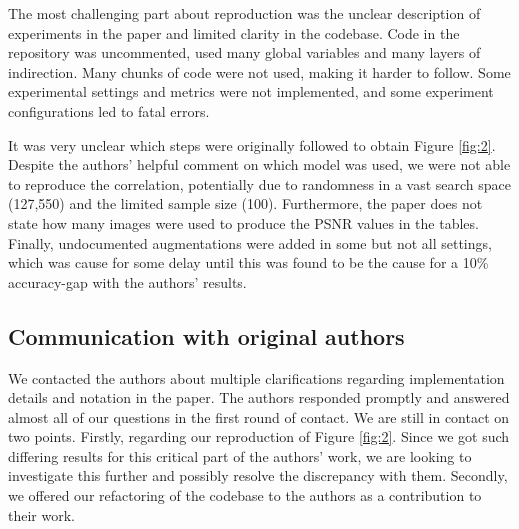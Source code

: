 The most challenging part about reproduction was the unclear description of experiments in the paper and limited clarity in the codebase. Code in the repository was uncommented, used many global variables and many layers of indirection. Many chunks of code were not used, making it harder to follow. Some experimental settings and metrics were not implemented, and some experiment configurations led to fatal errors.

It was very unclear which steps were originally followed to obtain Figure \ref{fig:2}. Despite the authors' helpful comment on which model was used, we were not able to reproduce the correlation, potentially due to randomness in a vast search space (127,550) and the limited sample size (100). Furthermore, the paper does not state how many images were used to produce the PSNR values in the tables. Finally, undocumented augmentations were added in some but not all settings, which was cause for some delay until this was found to be the cause for a 10\% accuracy-gap with the authors' results.

\subsection{Communication with original authors}

We contacted the authors about multiple clarifications regarding implementation details and notation in the paper. The authors responded promptly and answered almost all of our questions in the first round of contact. We are still in contact on two points. Firstly, regarding our reproduction of Figure \ref{fig:2}. Since we got such differing results for this critical part of the authors' work, we are looking to investigate this further and possibly resolve the discrepancy with them. Secondly, we offered our refactoring of the codebase to the authors as a contribution to their work.
